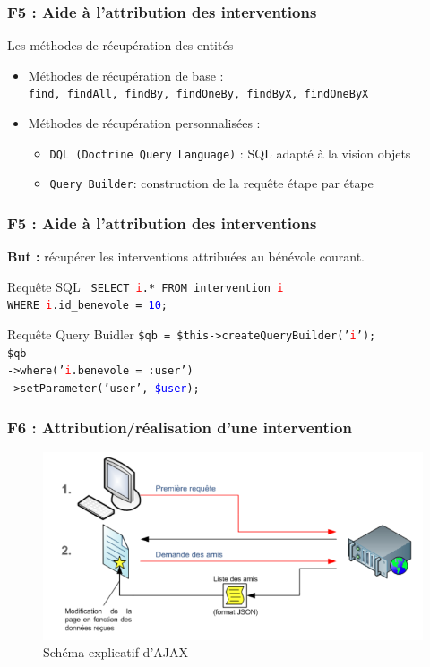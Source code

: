 \begin{frame}
\frametitle{F5 : Aide à l'attribution des interventions}
	\begin{block}{Les méthodes de récupération des entités}
		\begin{itemize}
			\item Méthodes de récupération de base : \\
			 \texttt{find, findAll, findBy, findOneBy, findByX, findOneByX}
			\item Méthodes de récupération personnalisées : \\
			\begin{itemize}
			\item \texttt{DQL (Doctrine Query Language)} : SQL adapté à la vision objets
			\item \texttt{Query Builder}: construction de la requête étape par étape
			\end{itemize}			
		\end{itemize}
	  \end{block}
\end{frame}

\begin{frame}
\frametitle{F5 : Aide à l'attribution des interventions}
	\textbf{But :} récupérer les interventions attribuées au bénévole courant. \\
	\vskip 0.5cm
	\begin{block}{Requête SQL }	
	\texttt{ 
	SELECT \textcolor{red}{i}.* FROM intervention \textcolor{red}{i} \\
	\setlength{\parindent}{1cm}	WHERE \textcolor{red}{i}.id\_benevole = \textcolor{blue}{10};}
	\end{block}
	\begin{block}{Requête Query Buidler }
	\noindent \texttt{\$qb = \$this->createQueryBuilder('\textcolor{red}{i}'); \\
	\noindent \$qb \\
	\setlength{\parindent}{1cm} ->where('\textcolor{red}{i}.benevole = :user') \\
    \setlength{\parindent}{1cm} ->setParameter('user', \textcolor{blue}{\$user});}
	\end{block}
\end{frame}

\begin{frame}
\frametitle{F6 : Attribution/réalisation d'une intervention}
      \begin{figure}[r]
		\includegraphics[scale=0.35]{images/ajax.png}
		\caption{Schéma explicatif d'AJAX}
	  \end{figure}
\end{frame}
